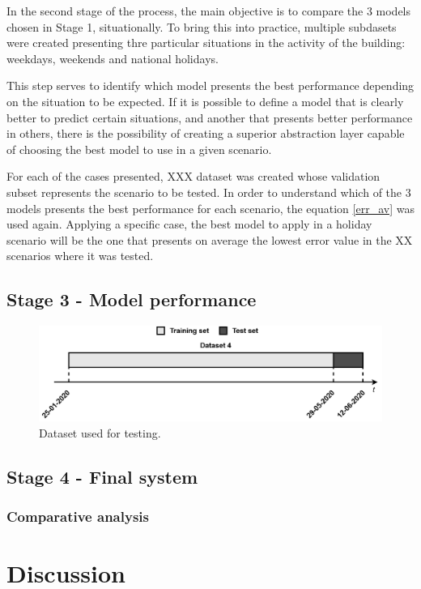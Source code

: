In the second stage of the process, the main objective is to compare the 3 models chosen in Stage 1, situationally. To bring this into practice, multiple subdasets were created presenting thre particular situations in the activity of the building: weekdays, weekends and national holidays.

This step serves to identify which model presents the best performance depending on the situation to be expected. If it is possible to define a model that is clearly better to predict certain situations, and another that presents better performance in others, there is the possibility of creating a superior abstraction layer capable of choosing the best model to use in a given scenario. 





For each of the cases presented, XXX dataset was created whose validation subset represents the scenario to be tested. In order to understand which of the 3 models presents the best performance for each scenario, the equation \ref{err_av} was used again. Applying a specific case, the best model to apply in a holiday scenario will be the one that presents on average the lowest error value in the XX scenarios where it was tested.

\subsection{Stage 3 - Model performance}

\begin{figure}[h!]
    \centering
    \begin{center}
    \includegraphics[width=1\textwidth]{Images/Test.png}
    \caption{Dataset used for testing.}
    \label{test}
    \end{center}
\end{figure}


\subsection{Stage 4 - Final system}
\subsubsection{Comparative analysis}

\section{Discussion}

